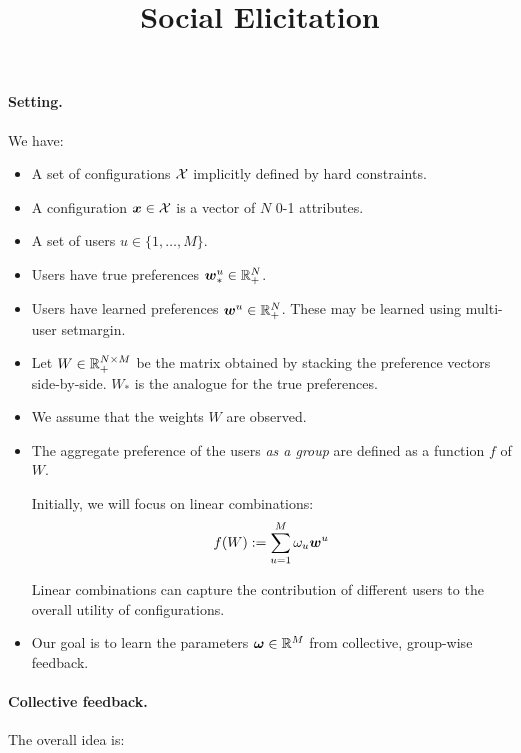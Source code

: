 \documentclass[12pt,a4paper]{article}
\title{Social Elicitation}
\begin{document}
\maketitle

\paragraph{Setting.} We have:

\begin{itemize}

    \item A set of configurations $\mathcal{X}$ implicitly defined by hard constraints.

    \item A configuration $\boldsymbol{x} \in \mathcal{X}$ is a vector of $N$ 0-1 attributes.

    \item A set of users $u \in \{1, \ldots, M\}$.

    \item Users have true preferences $\boldsymbol{w}^u_* \in \mathbb{R}^N_+$.

    \item Users have learned preferences $\boldsymbol{w}^u \in \mathbb{R}^N_+$.  These may be
        learned using multi-user setmargin.

    \item Let $W \in \mathbb{R}^{N \times M}_+$ be the matrix obtained by stacking
        the preference vectors side-by-side. $W_*$ is the analogue for the
        true preferences.

    \item We assume that the weights $W$ are observed.

    \item The aggregate preference of the users \emph{as a group} are
        defined as a function $f$ of $W$.

        Initially, we will focus on linear combinations:
        $$ f(W) := \sum_{u=1}^M \omega_u \boldsymbol{w}^u $$

        Linear combinations can capture the contribution of different users
        to the overall utility of configurations.

    \item Our goal is to learn the parameters $\boldsymbol{\omega} \in \mathbb{R}^M$ from
        collective, group-wise feedback.

\end{itemize}

\paragraph{Collective feedback.} The overall idea is:
\end{document}
